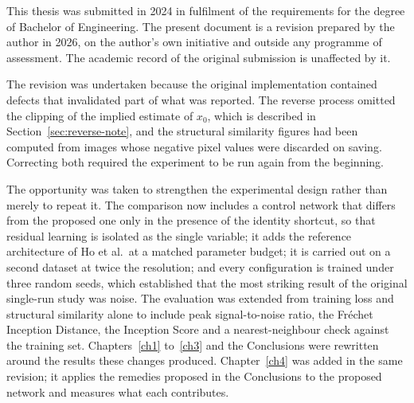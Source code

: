 This thesis was submitted in 2024 in fulfilment of the requirements for the degree of Bachelor of
Engineering. The present document is a revision prepared by the author in 2026, on the author's own
initiative and outside any programme of assessment. The academic record of the original submission
is unaffected by it.

The revision was undertaken because the original implementation contained defects that invalidated
part of what was reported. The reverse process omitted the clipping of the implied estimate of
$x_0$, which is described in Section~\ref{sec:reverse-note}, and the structural similarity figures
had been computed from images whose negative pixel values were discarded on saving. Correcting both
required the experiment to be run again from the beginning.

The opportunity was taken to strengthen the experimental design rather than merely to repeat it. The
comparison now includes a control network that differs from the proposed one only in the presence of
the identity shortcut, so that residual learning is isolated as the single variable; it adds the
reference architecture of Ho et al.\ at a matched parameter budget; it is carried out on a second
dataset at twice the resolution; and every configuration is trained under three random seeds, which
established that the most striking result of the original single-run study was noise. The evaluation
was extended from training loss and structural similarity alone to include peak signal-to-noise
ratio, the Fr\'echet Inception Distance, the Inception Score and a nearest-neighbour check against
the training set. Chapters~\ref{ch1} to~\ref{ch3} and the Conclusions were rewritten around the
results these changes produced. Chapter~\ref{ch4} was added in the same revision; it applies the
remedies proposed in the Conclusions to the proposed network and measures what each contributes.
